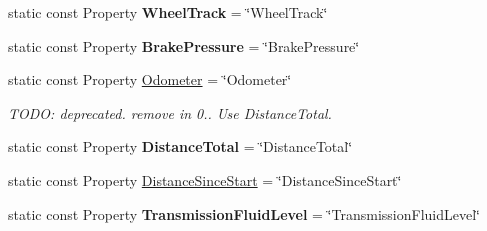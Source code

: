\begin{DoxyCompactItemize}
\item 
\hypertarget{classVehicleProperty_a02d72875c252d2763a40b6b0eb5dbe75}{static const Property {\bfseries Wheel\-Track} = \char`\"{}Wheel\-Track\char`\"{}}\label{classVehicleProperty_a02d72875c252d2763a40b6b0eb5dbe75}

\item 
\hypertarget{classVehicleProperty_a4e7d3a126e0055cf51cac18598fdf845}{static const Property {\bfseries Brake\-Pressure} = \char`\"{}Brake\-Pressure\char`\"{}}\label{classVehicleProperty_a4e7d3a126e0055cf51cac18598fdf845}

\item 
\hypertarget{classVehicleProperty_ad97147489a5be3babe1bb94dbb2cf970}{static const Property \hyperlink{classVehicleProperty_ad97147489a5be3babe1bb94dbb2cf970}{Odometer} = \char`\"{}Odometer\char`\"{}}\label{classVehicleProperty_ad97147489a5be3babe1bb94dbb2cf970}

\begin{DoxyCompactList}\small\item\em T\-O\-D\-O\-: deprecated. remove in 0.. Use Distance\-Total. \end{DoxyCompactList}\item 
\hypertarget{classVehicleProperty_a96c023be9ac18953544b0b1445bb9cc1}{static const Property {\bfseries Distance\-Total} = \char`\"{}Distance\-Total\char`\"{}}\label{classVehicleProperty_a96c023be9ac18953544b0b1445bb9cc1}

\item 
static const Property \hyperlink{classVehicleProperty_a340253da4ce8dfac2b40f3ee27d9ed4b}{Distance\-Since\-Start} = \char`\"{}Distance\-Since\-Start\char`\"{}
\item 
\hypertarget{classVehicleProperty_a288aa5c2be698825142da9d87c13c447}{static const Property {\bfseries Transmission\-Fluid\-Level} = \char`\"{}Transmission\-Fluid\-Level\char`\"{}}\label{classVehicleProperty_a288aa5c2be698825142da9d87c13c447}


\end{DoxyCompactItemize}
